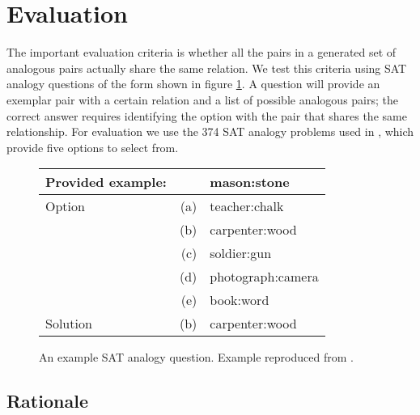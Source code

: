 \documentclass[11pt]{article}
\begin{document}
\section{Evaluation}
\label{sec:evaluation}

The important evaluation criteria is whether all the pairs in a generated set of
analogous pairs actually share the same relation.  We test this criteria using
SAT analogy questions of the form shown in figure \ref{fig:sat-question}.  A
question will provide an exemplar pair with a certain relation and a list of
possible analogous pairs; the correct answer requires identifying the option
with the pair that shares the same relationship.  For evaluation we use the 374
SAT analogy problems used in \cite{turney03combining}, which provide five
options to select from.  

\begin{figure}
  \begin{tabular}{lrl}
    \hline
    Provided example: & & mason:stone \\
    \hline
    Option & (a) & teacher:chalk \\
    & (b) & carpenter:wood  \\
    & (c) & soldier:gun \\
    & (d) & photograph:camera \\
    & (e) & book:word \\
    Solution & (b) & carpenter:wood  \\
    \hline
  \end{tabular}
  \caption{An example SAT analogy question.  Example reproduced from
    \cite{turney03combining}.}
  \label{fig:sat-question}
\end{figure}

\subsection{Rationale}
\end{document}
